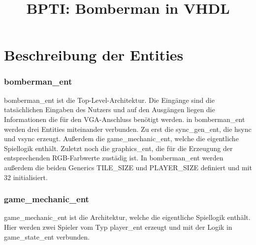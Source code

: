 \documentclass[parskip=full]{scrartcl}
\title{BPTI: Bomberman in VHDL}
\begin{document}
	\maketitle
	\part{Beschreibung der Entities}
		\section{bomberman\_ent}
			bomberman\_ent ist die Top-Level-Architektur. Die Eingänge sind die tatsächlichen Eingaben des Nutzers und auf den Ausgängen liegen die Informationen die für den VGA-Anschluss benötigt werden. in bomberman\_ent werden drei Entities miteinander verbunden. Zu erst die sync\_gen\_ent, die hsync und vsync erzeugt. Außerdem die game\_mechanic\_ent, welche die eigentliche Spiellogik enthält. Zuletzt noch die graphics\_ent, die für die Erzeugung der entsprechenden RGB-Farbwerte zustädig ist. In bomberman\_ent werden außerdem die beiden Generics TILE\_SIZE und PLAYER\_SIZE definiert und mit 32 initialisiert.
		
		\section{game\_mechanic\_ent}
			game\_mechanic\_ent ist die Architektur, welche die eigentliche Spiellogik enthält. Hier werden zwei Spieler vom Typ player\_ent erzeugt und mit der Logik in game\_state\_ent verbunden.
		
\end{document}
